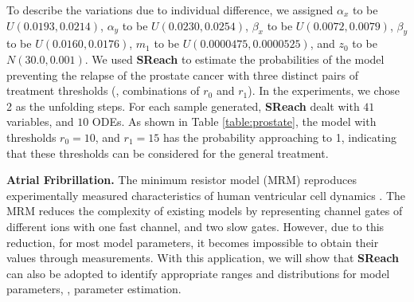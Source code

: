\vspace{-1.1cm}

To describe the variations due to individual difference, we assigned $\alpha_x$ to be $U(0.0193, 0.0214)$, $\alpha_y$ to be $U(0.0230, 0.0254)$, $\beta_x$ to be $U(0.0072, 0.0079)$, $\beta_y$ to be $U(0.0160, 0.0176)$, $m_1$ to be $U(0.0000475, 0.0000525) $, and $z_0$ to be $N(30.0, 0.001)$. 
We used {\bf SReach} to estimate the probabilities of the model preventing the relapse of the prostate cancer with three distinct pairs of treatment thresholds (\ie, combinations of $r_0$ and $r_1$).  In the experiments, we chose 2 as the unfolding steps. For each sample generated, {\bf SReach} dealt with $41$ variables, and $10$ ODEs. As shown in Table \ref{table:prostate}, the model with thresholds $r_0 = 10$, and $r_1 = 15$ has the probability approaching to 1, indicating that these thresholds can be considered for the general treatment. 

{\bf\noindent Atrial Fribrillation.} The minimum resistor model (MRM) reproduces experimentally measured characteristics 
of human ventricular cell dynamics \cite{bueno2008minimal}. 
The MRM reduces the complexity of existing models by representing channel gates of different ions with one fast channel, and two slow gates. However, due to this reduction, for most model parameters, it becomes impossible to obtain their values through measurements. With this application, we will show that {\bf SReach} can also be adopted to identify appropriate ranges and distributions for model parameters, \ie, parameter estimation.

